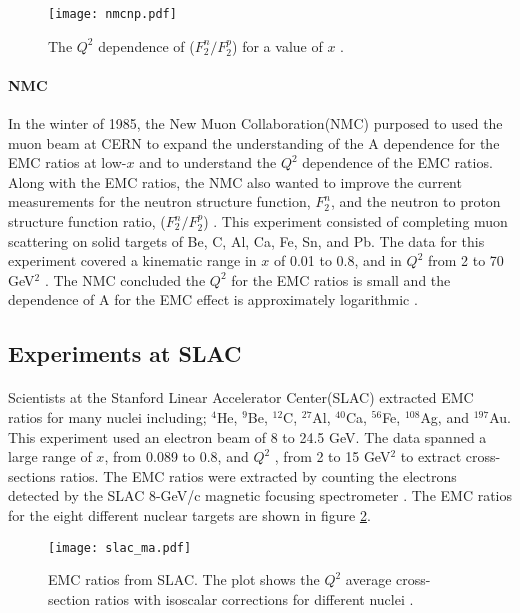 \begin{figure}[H]
	\centering
	\caption{The $Q^2$ dependence of ($F_2^n/F_2^p$) for a value of $x$ \cite{ref:NMC}.}
	\label{fig:nmcnp}
	\centering
	\texttt{[image: nmcnp.pdf]}
\end{figure}
\paragraph{NMC}In the winter of 1985, the New Muon Collaboration(NMC) purposed to used the muon beam at CERN to expand the understanding of the A dependence for the EMC ratios at low-$x$ and to understand the $Q^2$ dependence of the EMC ratios. Along with the EMC ratios, the NMC also wanted to improve the current measurements for the neutron structure function, $F_2^n$, and the neutron to proton structure function ratio, ($F_2^n/F_2^p$) \cite{NMCtech}. This experiment consisted of completing muon scattering on solid targets of Be, C, Al, Ca, Fe, Sn, and Pb. The data for this experiment covered a kinematic range in $x$ of 0.01 to 0.8, and in $Q^2$ from 2 to 70 GeV$^2$ \cite{ref:NMC}. The NMC concluded the $Q^2$ for the EMC ratios is small and the dependence of A for the EMC effect is approximately logarithmic \cite{ref:NMC,Ajth}. 

\subsection{Experiments at SLAC}
\paragraph{}Scientists at the Stanford Linear Accelerator Center(SLAC) extracted EMC ratios for many nuclei including; $^4$He, $^9$Be, $^{12}$C, $^{27}$Al, $^{40}$Ca, $^{56}$Fe, $^{108}$Ag, and $^{197}$Au. This experiment used an electron beam of 8 to 24.5 GeV. The data spanned a large range of $x$, from 0.089 to 0.8, and $Q^2$ , from 2 to 15 GeV$^2$ to extract cross-sections ratios. The EMC ratios were extracted by counting the electrons detected by the SLAC 8-GeV/c magnetic focusing spectrometer \cite{gomez}. The EMC ratios for the eight different nuclear targets are shown in figure \ref{gomez_ma}.
\begin{figure}[h]
	\centering
	\caption{EMC ratios from SLAC. The plot shows the $Q^2$ average cross-section ratios with isoscalar corrections for different nuclei \cite{gomez}.}
	\label{gomez_ma}
	\texttt{[image: slac\_ma.pdf]} 
\end{figure} 
